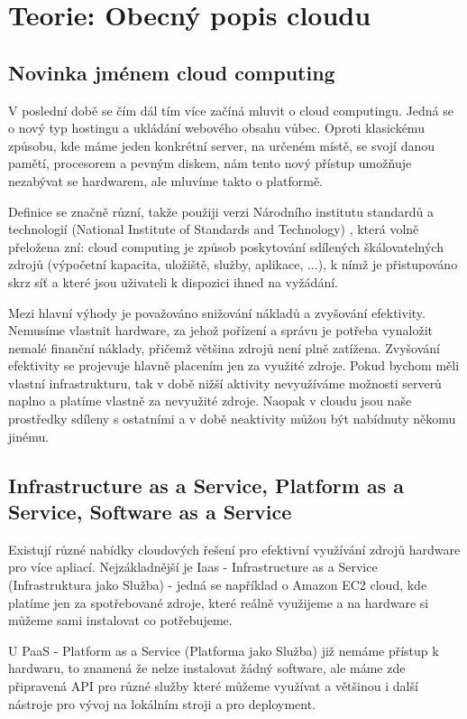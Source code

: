 \chapter{Teorie: Obecný popis cloudu}

\section{Novinka jménem cloud computing}
V poslední době se čím dál tím více začíná mluvit o cloud computingu. Jedná se o nový typ hostingu a ukládání webového obsahu vůbec. Oproti klasickému způsobu, kde máme jeden konkrétní server, na určeném místě, se svojí danou pamětí, procesorem a pevným diskem, nám tento nový přístup umožňuje nezabývat se hardwarem, ale mluvíme takto o platformě. 

Definice se značně různí, takže použiji verzi Národního institutu standardů a technologií (National Institute of Standards and Technology) \cite{nist-cloud},
která volně přeložena zní: cloud computing je způsob poskytování sdílených škálovatelných zdrojů (výpočetní kapacita, uložiště, služby, aplikace, ...), k nímž je přistupováno skrz síť a které jsou uživateli k dispozici ihned na vyžádání. 

Mezi hlavní výhody je považováno snižování nákladů a zvyšování efektivity. Nemusíme vlastnit hardware, za jehož pořízení a správu je potřeba vynaložit nemalé finanční náklady, přičemž většina zdrojů není plně zatížena. Zvyšování efektivity se projevuje hlavně placením jen za využité zdroje. Pokud bychom měli vlastní infrastrukturu, tak v době nižší aktivity nevyužíváme možnosti serverů naplno a platíme vlastně za nevyužité zdroje. Naopak v cloudu jsou naše prostředky sdíleny s ostatními a v době neaktivity můžou být nabídnuty někomu jinému.

\section{Infrastructure as a Service, Platform as a Service, Software as a Service}
Existují různé nabídky cloudových řešení pro efektivní využívání zdrojů hardware pro více apliací. Nejzákladnější je Iaas - Infrastructure as a Service (Infrastruktura jako Služba) - jedná se například o Amazon EC2 \cite{amazon-ec2} cloud, kde platíme jen za spotřebované zdroje, které reálně využijeme a na hardware si můžeme sami instalovat co potřebujeme. 

U PaaS - Platform as a Service  (Platforma jako Služba) již nemáme přístup k hardwaru, to znamená že nelze instalovat žádný software, ale máme zde připravená API pro různé služby které můžeme využívat a většinou i další nástroje pro vývoj na lokálním stroji a pro deployment.

